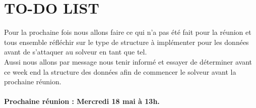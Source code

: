 \section*{TO-DO LIST}
\tabto{1cm}Pour la prochaine fois nous allons faire ce qui n'a pas été fait pour la réunion et tous ensemble réfléchir sur le type de structure à implémenter pour les données avant de s'attaquer au solveur en tant que tel.
 \\ 
 Aussi nous allons par message nous tenir informé et essayer de déterminer avant ce week end la structure des données afin de commencer le solveur avant la prochaine réunion.
  \\ \\


\tabto{0cm}\textbf{Prochaine réunion : Mercredi 18 mai à 13h.}
